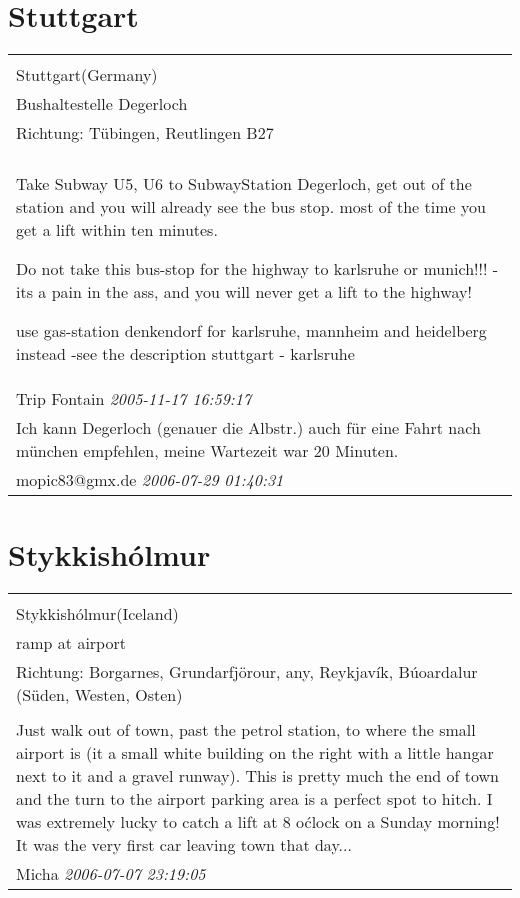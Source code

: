 \documentclass[a4paper,12pt]{article}
\begin{document}
\section{Stuttgart}
\begin{tabular}{|p{13cm}|}
\hline\\
Stuttgart(Germany)\\
Bushaltestelle Degerloch\\
Richtung: Tübingen, Reutlingen B27 \\
\hline\\
Take Subway U5, U6 to SubwayStation Degerloch, get out of the station and you will already see the bus stop. most of the time you get a lift within ten minutes.

Do not take this bus-stop for the highway to karlsruhe or munich!!! - its a pain in the ass, and you will never get a lift to the highway!

use gas-station denkendorf for karlsruhe, mannheim and heidelberg instead -see the description stuttgart - karlsruhe \\
Trip Fontain \textit{ 2005-11-17 16:59:17 }\\\hline Ich kann Degerloch (genauer die Albstr.) auch für eine Fahrt nach münchen empfehlen, meine Wartezeit war 20 Minuten. \\
mopic83@gmx.de \textit{ 2006-07-29 01:40:31 }\\\hline
\end{tabular}


\section{Stykkishólmur}
\begin{tabular}{|p{13cm}|}
\hline\\
Stykkishólmur(Iceland)\\
ramp at airport\\
Richtung: Borgarnes, Grundarfjörour, any, Reykjavík, Búoardalur (Süden, Westen, Osten) \\
\hline\\
Just walk out of town, past the petrol station, to where the small airport is (it a small white building on the right with a little hangar next to it and a gravel runway). This is pretty much the end of town and the turn to the airport parking area is a perfect spot to hitch. I was extremely lucky to catch a lift at 8 o\'clock on a Sunday morning! It was the very first car leaving town that day... \\
Micha \textit{ 2006-07-07 23:19:05 }\\\hline
\end{tabular}
\end{document}
